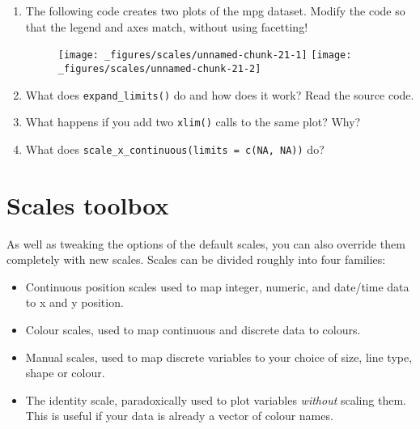 \begin{enumerate}
\def\labelenumi{\arabic{enumi}.}
\item
  The following code creates two plots of the mpg dataset. Modify the
  code so that the legend and axes match, without using facetting!

\begin{Shaded}
\begin{Highlighting}[]
\StringTok{ }\NormalTok{)}
\StringTok{ }\NormalTok{)}

 \StringTok{ }\NormalTok{()}
 \StringTok{ }\NormalTok{()}
\end{Highlighting}
\end{Shaded}

  \begin{figure}[H]
    \texttt{[image: \_figures/scales/unnamed-chunk-21-1]}%
    \texttt{[image: \_figures/scales/unnamed-chunk-21-2]}
  \end{figure}
\item
  What does \texttt{expand\_limits()} do and how does it work? Read the
  source code.
\item
  What happens if you add two \texttt{xlim()} calls to the same plot?
  Why?
\item
  What does \texttt{scale\_x\_continuous(limits\ =\ c(NA,\ NA))} do?
\end{enumerate}

\hypertarget{sec:scale-details}{\section{Scales
toolbox}\label{sec:scale-details}}

As well as tweaking the options of the default scales, you can also
override them completely with new scales. Scales can be divided roughly
into four families:

\begin{itemize}
\item
  Continuous position scales used to map integer, numeric, and date/time
  data to x and y position.
\item
  Colour scales, used to map continuous and discrete data to colours.
\item
  Manual scales, used to map discrete variables to your choice of size,
  line type, shape or colour.
\item
  The identity scale, paradoxically used to plot variables
  \emph{without} scaling them. This is useful if your data is already a
  vector of colour names.
\end{itemize}

